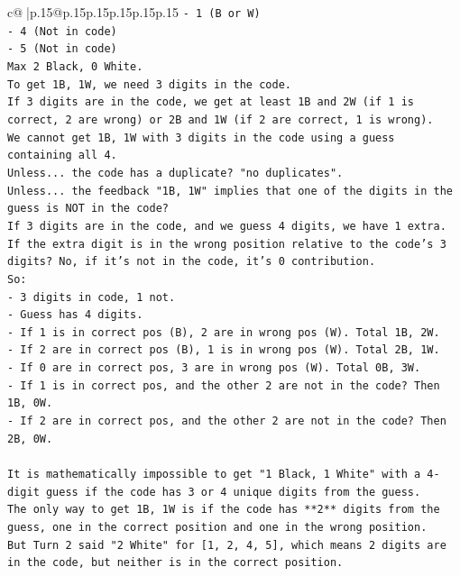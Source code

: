 \documentclass{article}
\begin{document}
{\begin{supertabular}{c@{$\;$}|p{.15\linewidth}@{}p{.15\linewidth}p{.15\linewidth}p{.15\linewidth}p{.15\linewidth}p{.15\linewidth}}
{{{\texttt{{-} 1 (B or W)} \\
\texttt{{-} 4 (Not in code)} \\
\texttt{{-} 5 (Not in code)} \\
\texttt{Max 2 Black, 0 White.} \\
\texttt{To get 1B, 1W, we need 3 digits in the code.} \\
\texttt{If 3 digits are in the code, we get at least 1B and 2W (if 1 is correct, 2 are wrong) or 2B and 1W (if 2 are correct, 1 is wrong).} \\
\texttt{We cannot get 1B, 1W with 3 digits in the code using a guess containing all 4.} \\
\texttt{Unless... the code has a duplicate? "no duplicates".} \\
\texttt{Unless... the feedback "1B, 1W" implies that one of the digits in the guess is NOT in the code?} \\
\texttt{If 3 digits are in the code, and we guess 4 digits, we have 1 extra.} \\
\texttt{If the extra digit is in the wrong position relative to the code's 3 digits? No, if it's not in the code, it's 0 contribution.} \\
\texttt{So:} \\
\texttt{{-} 3 digits in code, 1 not.} \\
\texttt{{-} Guess has 4 digits.} \\
\texttt{{-} If 1 is in correct pos (B), 2 are in wrong pos (W). Total 1B, 2W.} \\
\texttt{{-} If 2 are in correct pos (B), 1 is in wrong pos (W). Total 2B, 1W.} \\
\texttt{{-} If 0 are in correct pos, 3 are in wrong pos (W). Total 0B, 3W.} \\
\texttt{{-} If 1 is in correct pos, and the other 2 are not in the code? Then 1B, 0W.} \\
\texttt{{-} If 2 are in correct pos, and the other 2 are not in the code? Then 2B, 0W.} \\
\\ 
\texttt{It is mathematically impossible to get "1 Black, 1 White" with a 4{-}digit guess if the code has 3 or 4 unique digits from the guess.} \\
\texttt{The only way to get 1B, 1W is if the code has **2** digits from the guess, one in the correct position and one in the wrong position.} \\
\texttt{But Turn 2 said "2 White" for {[}1, 2, 4, 5{]}, which means 2 digits are in the code, but neither is in the correct position.} \\
}}}
\end{supertabular}}
\end{document}
